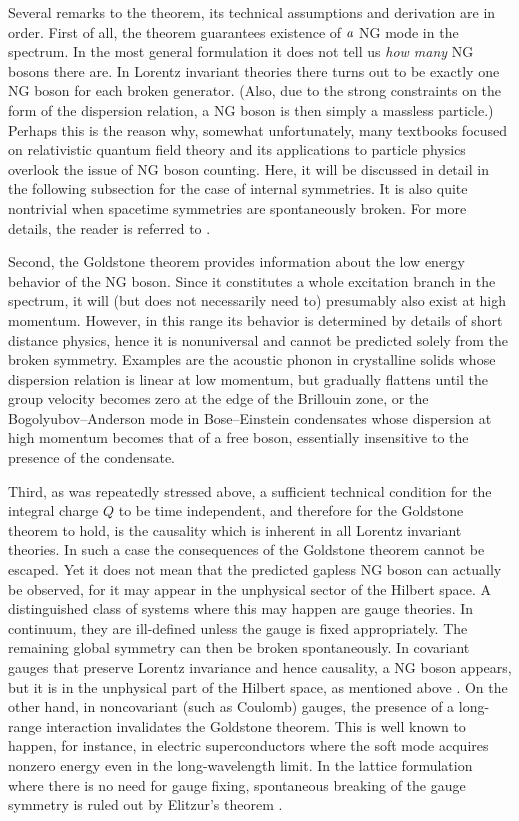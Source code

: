 \documentclass[final,3p,times,12pt,a4paper,sort&compress]{elsarticle}
\begin{document}
Several remarks to the theorem, its technical assumptions and derivation are in
order. First of all, the theorem guarantees existence of $\emph{a}$ NG mode in
the spectrum. In the most general formulation it does not tell us \emph{how
many} NG bosons there are. In Lorentz invariant theories there turns out to be
exactly one NG boson for each broken generator. (Also, due to the strong
constraints on the form of the dispersion relation, a NG boson is then simply a
massless particle.) Perhaps this is the reason why, somewhat unfortunately,
many textbooks focused on relativistic quantum field theory and its
applications to particle physics overlook the issue of NG boson counting. Here,
it will be discussed in detail in the following subsection for the case of
internal symmetries. It is also quite nontrivial when spacetime symmetries are
spontaneously broken. For more details, the reader is referred to
\cite{Low:2001bw}.

Second, the Goldstone theorem provides information about the low energy
behavior of the NG boson. Since it constitutes a whole excitation branch in the
spectrum, it will (but does not necessarily need to) presumably also exist at
high momentum. However, in this range its behavior is determined by details of
short distance physics, hence it is nonuniversal and cannot be predicted solely
from the broken symmetry. Examples are the acoustic phonon in crystalline
solids whose dispersion relation is linear at low momentum, but gradually
flattens until the group velocity becomes zero at the edge of the Brillouin
zone, or the Bogolyubov--Anderson mode in Bose--Einstein condensates whose
dispersion at high momentum becomes that of a free boson, essentially
insensitive to the presence of the condensate.

Third, as was repeatedly stressed above, a sufficient technical condition for
the integral charge $Q$ to be time independent, and therefore for the Goldstone
theorem to hold, is the causality which is inherent in all Lorentz invariant
theories. In such a case the consequences of the Goldstone theorem cannot be
escaped. Yet it does not mean that the predicted gapless NG boson can actually
be observed, for it may appear in the unphysical sector of the Hilbert space.
A distinguished class of systems where this may happen are gauge theories.
In continuum, they are ill-defined unless the gauge is fixed appropriately.
The remaining global symmetry can then be broken spontaneously. In
covariant gauges that preserve Lorentz invariance and hence causality, a NG
boson appears, but it is in the unphysical part of the Hilbert space, as
mentioned above \cite{Boulware:1962zz,Englert:1964et,Guralnik:1964eu}. On the
other hand, in noncovariant (such as Coulomb) gauges, the presence of
a long-range interaction invalidates the Goldstone theorem. This is well known
to happen, for instance, in electric superconductors where the soft mode
acquires nonzero energy even in the long-wavelength limit. In the lattice
formulation where there is no need for gauge fixing, spontaneous breaking of
the gauge symmetry is ruled out by Elitzur's theorem \cite{Elitzur:1975im}.
\end{document}
